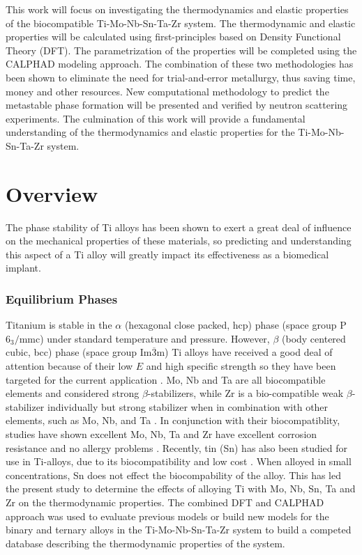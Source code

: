 This work will focus on investigating the thermodynamics and elastic properties of the biocompatible Ti-Mo-Nb-Sn-Ta-Zr system. The thermodynamic and elastic properties will be calculated using first-principles based on Density Functional Theory (DFT). The parametrization of the properties will be completed using the CALPHAD modeling approach. The combination of these two methodologies has been shown to eliminate the need for trial-and-error metallurgy, thus saving time, money and other resources. New computational methodology to predict the metastable phase formation will be presented and verified by neutron scattering experiments. The culmination of this work will provide a fundamental understanding of the thermodynamics and elastic properties for the Ti-Mo-Nb-Sn-Ta-Zr system. 


\section{Overview}

The phase stability of Ti alloys has been shown to exert a great deal of influence on the mechanical properties of these materials, so predicting and understanding this aspect of a Ti alloy will greatly impact its effectiveness as a biomedical implant.


\subsubsection{Equilibrium Phases}

Titanium is stable in the $\alpha$ (hexagonal close packed, hcp) phase (space group P$6_{3}/$mmc) under standard temperature and pressure. However, $\beta$ (body centered cubic, bcc) phase (space group Im$\overline{3}$m)  Ti alloys have received a good deal of attention because of their low $E$ and high specific strength so they have been targeted for the current application \cite{Mei2011,Brailovski2011b}. Mo, Nb and Ta are all biocompatible elements and considered strong $\beta$-stabilizers, while Zr is a bio-compatible weak $\beta$-stabilizer individually but strong stabilizer when in combination with other elements, such as Mo, Nb, and Ta \cite{Long1998a}. In conjunction with their biocompatiblity, studies have shown excellent Mo, Nb, Ta and Zr have excellent corrosion resistance and no allergy problems \cite{Tane2008a}. Recently, tin (Sn) has also been studied for use in Ti-alloys, due to its biocompatibility and low cost \cite{Niinomi2012}. When alloyed in small concentrations, Sn does not effect the biocompability of the alloy. This has led the present study to determine the effects of alloying Ti with Mo, Nb, Sn, Ta and Zr on the thermodynamic properties. The combined DFT and CALPHAD approach was used to evaluate previous models or build new models for the binary and ternary alloys in the Ti-Mo-Nb-Sn-Ta-Zr system to build a competed database describing the thermodynamic properties of the system.

